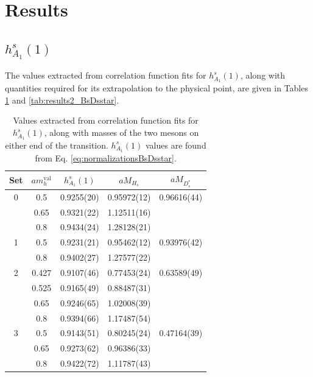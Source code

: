 \section{Results}
\label{sec:results_BsDsstar}

\subsection{$h^s_{A_1}(1)$}

The values extracted from correlation function fits for $h^s_{A_1}(1)$, along with quantities required for its extrapolation to the physical point, are given in Tables \ref{tab:results_BsDsstar} and \ref{tab:results2_BsDsstar}.

\begin{table}
\begin{center}
\begin{tabular}{ c c c c c }
\hline
Set & $am_h^{\text{val}}$ & $h^s_{A_1}(1)$& $aM_{H_s}$& $aM_{D^*_s}$\\ [0.5ex]
\hline
0 & 0.5 & 0.9255(20) & 0.95972(12) & 0.96616(44)\\ [0.5ex] 
 & 0.65 & 0.9321(22) & 1.12511(16) & \\ [0.5ex] 
 & 0.8 & 0.9434(24) & 1.28128(21) & \\ [0.5ex] 
\hline
1 & 0.5 & 0.9231(21) & 0.95462(12) & 0.93976(42)\\ [0.5ex] 
 & 0.8 & 0.9402(27) & 1.27577(22) & \\ [0.5ex] 
\hline
2 & 0.427 & 0.9107(46) & 0.77453(24) & 0.63589(49)\\ [0.5ex] 
 & 0.525 & 0.9165(49) & 0.88487(31) & \\ [0.5ex] 
 & 0.65 & 0.9246(65) & 1.02008(39) & \\ [0.5ex] 
 & 0.8 & 0.9394(66) & 1.17487(54) & \\ [0.5ex] 
\hline
3 & 0.5 & 0.9143(51) & 0.80245(24) & 0.47164(39)\\ [0.5ex] 
 & 0.65 & 0.9273(62) & 0.96386(33) & \\ [0.5ex] 
 & 0.8 & 0.9422(72) & 1.11787(43) & \\ [0.5ex] 
\hline
\end{tabular}
\caption{Values extracted from correlation function fits for $h^s_{A_1}(1)$, along with masses of the two mesons on either end of the transition. $h^s_{A_1}(1)$ values are found from Eq. \eqref{eq:normalizationsBsDsstar}. \label{tab:results_BsDsstar}}
\end{center}
\end{table}

